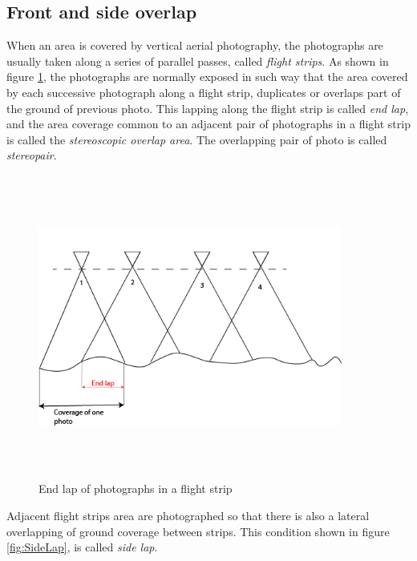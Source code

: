 \subsection{Front and side overlap}
When an area is covered by vertical aerial photography, the photographs are usually taken along a series of parallel passes, called \textit{flight strips}. As shown in figure \ref{fig:EndLap}, the photographs are normally exposed in such way that the area covered by each successive photograph along a flight strip, duplicates or overlaps part of the ground of previous photo. This lapping along the flight strip is called \textit{end lap}, and the area coverage common to an adjacent pair of photographs in a flight strip is called the \textit{stereoscopic overlap area}. The overlapping pair of photo is called \textit{stereopair}\cite{elements_photogrammetry}.
\begin{figure}[H]
\centering
\includegraphics[width=10cm,height=10cm,keepaspectratio]{imagenes/End_Lap.png}
\caption{End lap of photographs in a flight strip}
\label{fig:EndLap}
\end{figure}
Adjacent flight strips area  are photographed so that there is also a lateral overlapping of ground coverage between strips. This condition shown in figure \ref{fig:SideLap}, is called \textit{side lap}\cite{elements_photogrammetry}.
